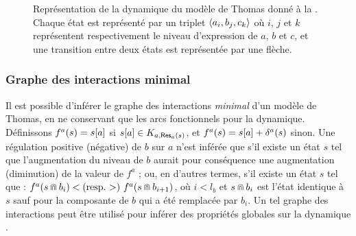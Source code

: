 \begin{example}
  \begin{figure}[ht]
    \begin{center}
    \end{center}
    \caption{%
      Représentation de la dynamique du modèle de Thomas donné à la .
      Chaque état est représenté par un triplet $\mbox{$\langle a_i, b_j, c_k \rangle$}$
      où $i$, $j$ et $k$ représentent respectivement le niveau d'expression de $a$, $b$ et $c$,
      et une transition entre deux états est représentée par une flèche.
    }
  \end{figure}
\end{example}



\subsubsection*{Graphe des interactions minimal}
Il est possible d'inférer le graphe des interactions \emph{minimal} d'un modèle de Thomas,
en ne conservant que les arcs fonctionnels pour la dynamique.
Définissons $f^a(s) = {s[a]}$ si $s[a]\in K_{a, \mathsf{Res}_{a}(s)}$,
et $f^a(s) = {s[a]} + \delta^a(s)$ sinon.
Une régulation positive (\resp négative) de $b$ sur $a$ n'est inférée que s'il existe
un état $s$ tel que l'augmentation du niveau de $b$ aurait pour conséquence
une augmentation (\resp diminution) de la valeur de $f^a$ ;
ou, en d'autres termes, s'il existe un état $s$ tel que :
$f^a(s \Cap b_i) < \text{(resp.\ $>$) } f^a(s \Cap b_{i+1})$, 
où $i < l_b$ et $s \Cap b_i$ est l'état identique à $s$
sauf pour la composante de $b$ qui a été remplacée par $b_i$.
Un tel graphe des interactions peut être utilisé pour inférer des propriétés globales sur
la dynamique .

